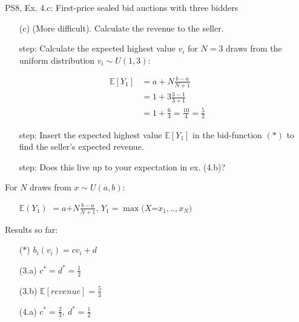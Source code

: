\begin{frame}{PS8, Ex. 4.c: First-price sealed bid auctions with three bidders}
    \begin{itemize}
      \item[(c)] (More difficult). Calculate the revenue to the seller.
    \end{itemize}
    \vspace{-10pt}
    \begin{multicols}{2}
      \begin{itemize}
        \item[\nth{1} step:] Calculate the expected highest value $v_i$ for $N=3$ draws from the uniform distribution $v_i\sim U(1,3)$:
      \end{itemize}
      \vspace{-8pt}
      \begin{align*}
        \mathbb{E}[Y_1]&=a+N\frac{b-a}{N+1}\\
                       &=1+3\frac{3-1}{3+1}\\
                       &=1+\frac{6}{4}=\frac{10}{4}=\frac{5}{2}
      \end{align*}
      \vspace{-12pt}
      \begin{itemize}
        \item[\nth{2} step:] Insert the expected highest value $\mathbb{E}[Y_1]$ in the bid-function $(*)$  to find the seller's expected revenue.
        \item[\nth{3} step:] Does this live up to your expectation in ex. (4.b)?
      \end{itemize}
      \vfill\null\columnbreak
      For $N$ draws from $x\sim U(a, b):$
      \vspace{-6pt}
      \begin{enumerate}
        \item[$\mathbb{E}(Y_1)$] $=a$+$N\frac{b-a}{N+1}$, $Y_1=\max(X$=$x_1,..,x_N)$
      \end{enumerate}
      \vspace{-6pt}
      Results so far:
      \vspace{-6pt}
      \begin{itemize}
        \item[($*$)] $b_i(v_i) = cv_i+d$
        \item[(3.a)] $c^*=d^*=\frac{1}{2}$
        \item[(3.b)] $\mathbb{E}[revenue]=\frac{5}{3}$
        \item[(4.a)] $c^*=\frac{2}{3},\ d^*=\frac{1}{2}$

\end{itemize}
\end{multicols}
\end{frame}
